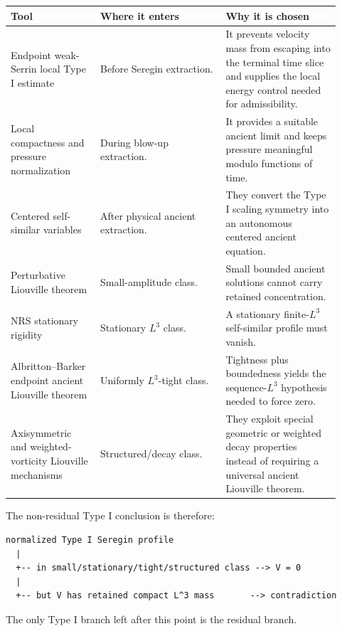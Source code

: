 \documentclass[11pt]{amsart}
\begin{document}
\begin{longtable}{@{}>{\raggedright\arraybackslash}p{0.25\linewidth}>{\raggedright\arraybackslash}p{0.35\linewidth}>{\raggedright\arraybackslash}p{0.32\linewidth}@{}}
\toprule
\textbf{Tool} & \textbf{Where it enters} & \textbf{Why it is chosen} \\
\midrule
\endhead
Endpoint weak-Serrin local Type I estimate & Before Seregin extraction. & It prevents velocity mass from escaping into the terminal time slice and supplies the local energy control needed for admissibility. \\
Local compactness and pressure normalization & During blow-up extraction. & It provides a suitable ancient limit and keeps pressure meaningful modulo functions of time. \\
Centered self-similar variables & After physical ancient extraction. & They convert the Type I scaling symmetry into an autonomous centered ancient equation. \\
Perturbative Liouville theorem & Small-amplitude class. & Small bounded ancient solutions cannot carry retained concentration. \\
NRS stationary rigidity & Stationary \(L^3\) class. & A stationary finite-\(L^3\) self-similar profile must vanish. \\
Albritton--Barker endpoint ancient Liouville theorem & Uniformly \(L^3\)-tight class. & Tightness plus boundedness yields the sequence-\(L^3\) hypothesis needed to force zero. \\
Axisymmetric and weighted-vorticity Liouville mechanisms & Structured/decay class. & They exploit special geometric or weighted decay properties instead of requiring a universal ancient Liouville theorem. \\
\bottomrule
\end{longtable}

The non-residual Type I conclusion is therefore:

\begin{center}
\begin{minipage}{0.92\linewidth}
\scriptsize
\begin{verbatim}
normalized Type I Seregin profile
  |
  +-- in small/stationary/tight/structured class --> V = 0
  |
  +-- but V has retained compact L^3 mass       --> contradiction
\end{verbatim}
\end{minipage}
\end{center}

The only Type I branch left after this point is the residual branch.
\end{document}
